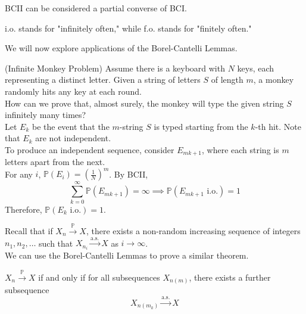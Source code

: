 \documentclass{huhtakm-template-book}
\newcommand{\prob}{\mathbb{P}}
\begin{document}
    \begin{rem}
        BCII can be considered a partial converse of BCI.
    \end{rem}
    \begin{rem}
        i.o. stands for "infinitely often," while f.o. stands for "finitely often."
    \end{rem}
    We will now explore applications of the Borel-Cantelli Lemmas.
    \begin{eg}(Infinite Monkey Problem)
        Assume there is a keyboard with $N$ keys, each representing a distinct letter. Given a string of letters $S$ of length $m$, a monkey randomly hits any key at each round.\\
        How can we prove that, almost surely, the monkey will type the given string $S$ infinitely many times?\\
        Let $E_{k}$ be the event that the $m$-string $S$ is typed starting from the $k$-th hit. Note that $E_{k}$ are not independent.\\
        To produce an independent sequence, consider $E_{mk+1}$, where each string is $m$ letters apart from the next.\\
        For any $i$, $\prob(E_{i})=\left(\frac{1}{N}\right)^{m}$. By BCII,
        \begin{equation*}
            \sum_{k=0}^{\infty}\prob(E_{mk+1})=\infty\implies\prob(E_{mk+1}\text{ i.o.})=1
        \end{equation*}
        Therefore, $\prob(E_{k}\text{ i.o.})=1$.
    \end{eg}
    \newpage
    Recall that if $X_{n}\xrightarrow{\prob}X$, there exists a non-random increasing sequence of integers $n_{1},n_{2},\dots$ such that $X_{n_{i}}\xrightarrow{\text{a.s.}}X$ as $i\to\infty$.\\
    We can use the Borel-Cantelli Lemmas to prove a similar theorem.
    \begin{thm}
        $X_{n}\xrightarrow{\prob}X$ if and only if for all subsequences $X_{n(m)}$, there exists a further subsequence
        \begin{equation*}
            X_{n(m_{k})}\xrightarrow{\text{a.s.}}X
        \end{equation*}
    \end{thm}
\end{document}
